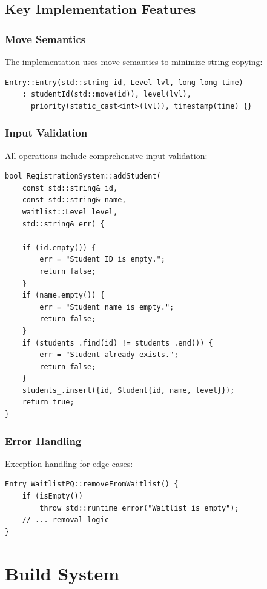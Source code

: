 \documentclass[12pt,a4paper]{article}
\begin{document}
\subsection{Key Implementation Features}

\subsubsection{Move Semantics}
The implementation uses move semantics to minimize string copying:

\begin{lstlisting}[caption=Entry Constructor with Move Semantics]
Entry::Entry(std::string id, Level lvl, long long time)
    : studentId(std::move(id)), level(lvl), 
      priority(static_cast<int>(lvl)), timestamp(time) {}
\end{lstlisting}

\subsubsection{Input Validation}
All operations include comprehensive input validation:

\begin{lstlisting}[caption=Input Validation Example]
bool RegistrationSystem::addStudent(
    const std::string& id, 
    const std::string& name, 
    waitlist::Level level, 
    std::string& err) {
    
    if (id.empty()) { 
        err = "Student ID is empty."; 
        return false; 
    }
    if (name.empty()) { 
        err = "Student name is empty."; 
        return false; 
    }
    if (students_.find(id) != students_.end()) { 
        err = "Student already exists."; 
        return false; 
    }
    students_.insert({id, Student{id, name, level}});
    return true;
}
\end{lstlisting}

\subsubsection{Error Handling}
Exception handling for edge cases:

\begin{lstlisting}[caption=Exception Handling]
Entry WaitlistPQ::removeFromWaitlist() {
    if (isEmpty()) 
        throw std::runtime_error("Waitlist is empty");
    // ... removal logic
}
\end{lstlisting}

\section{Build System}
\end{document}
